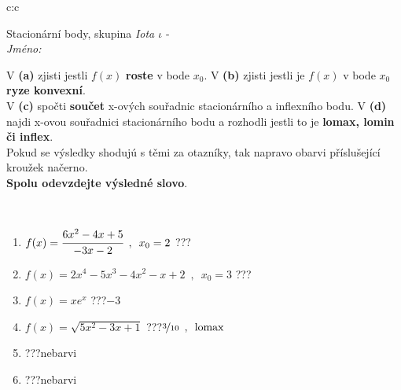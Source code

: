 \documentclass[10pt]{report}
\begin{document}
\newpage
\thispagestyle{empty}
\begin{tabular}{c:c}
\begin{minipage}[c][104.5mm][t]{0.5\linewidth}
\begin{center}
\vspace{7mm}
{\huge Stacionární body, skupina \textit{Iota $\iota$} -}\\[5mm]
\textit{Jméno:}\phantom{xxxxxxxxxxxxxxxxxxxxxxxxxxxxxxxxxxxxxxxxxxxxxxxxxxxxxxxxxxxxxxxxx}\\[5mm]
\begin{minipage}{0.95\linewidth}
\begin{center}
{\small V \textbf{(a)} zjisti jestli $f(x)$ \textbf{roste} v bode $x_0$. V \textbf{(b)} zjisti jestli je $f(x)$ v bode $x_0$ \textbf{ryze konvexní}.\\V \textbf{(c)} spočti \textbf{součet} x-ových souřadnic stacionárního a inflexního bodu. V \textbf{(d)} najdi x-ovou souřadnici stacionárního bodu a rozhodli jestli to je \textbf{lomax, lomin či inflex}.\\Pokud se výsledky shodujú s těmi za otazníky, tak napravo obarvi příslušející kroužek načerno.\\\textbf{Spolu odevzdejte výsledné slovo}}.
\end{center}
\end{minipage}
\\[1mm]
\begin{minipage}{0.79\linewidth}
\begin{center}
\begin{varwidth}{\linewidth}
\begin{enumerate}
\normalsize
\item $f(x)=\cfrac{6x^2-4x+5}{-3x-2}\enspace , \enspace x_0=2$\quad \dotfill\; ???\;\dotfill \quad {}
\item $f(x)=2x^4-5x^3-4x^2-x+2\enspace , \enspace x_0=3$\quad \dotfill\; ???\;\dotfill \quad {}
\item $f(x)=xe^{x}$\quad \dotfill\; ???\;\dotfill \quad $-3$
\item $f(x)=\sqrt{5x^2-3x+1}$\quad \dotfill\; ???\;\dotfill \quad $\nicefrac{3}{10}\enspace , \enspace\mathrm{lomax}$
\item \quad \dotfill\; ???\;\dotfill \quad nebarvi
\item \quad \dotfill\; ???\;\dotfill \quad nebarvi
\end{enumerate}
\end{varwidth}
\end{center}

\end{minipage}
\end{center}
\end{minipage}
\end{tabular}
\end{document}
